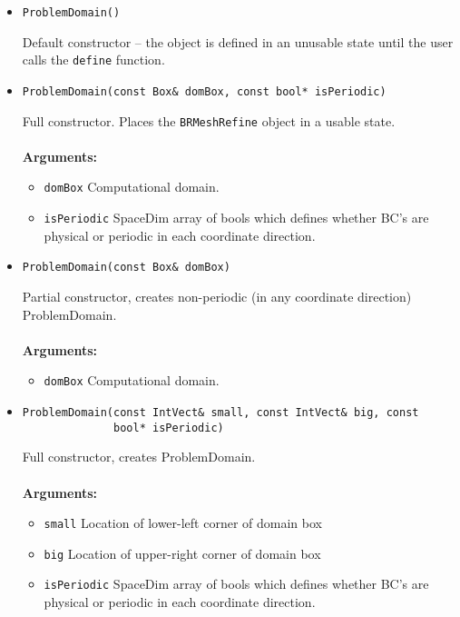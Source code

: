 \begin{itemize}
\item
\begin{verbatim}
ProblemDomain()
\end{verbatim}
Default constructor -- the object is defined in an unusable state
until the user calls the {\tt define} function.

\item
\begin{verbatim}
ProblemDomain(const Box& domBox, const bool* isPeriodic)
\end{verbatim}
Full constructor.  Places the {\tt BRMeshRefine} object in a usable
state. \\
\\
{\bf Arguments:} 
\begin{itemize} 
\item  \verb/domBox/ Computational domain.
\item  \verb/isPeriodic/ SpaceDim array of bools which defines
whether BC's are physical or periodic in each coordinate direction.   

\end{itemize}


\item
\begin{verbatim}
ProblemDomain(const Box& domBox)
\end{verbatim}
Partial constructor, creates non-periodic (in any coordinate
direction) ProblemDomain. \\
\\
{\bf Arguments:}
\begin{itemize}
\item \verb/domBox/ Computational domain.
\end{itemize}

\item
\begin{verbatim}
ProblemDomain(const IntVect& small, const IntVect& big, const
              bool* isPeriodic)
\end{verbatim}
Full constructor, creates ProblemDomain. \\
\\
{\bf Arguments:}
\begin{itemize}
\item \verb/small/ Location of lower-left corner of domain box
\item \verb/big/  Location of upper-right corner of domain box
\item  \verb/isPeriodic/ SpaceDim array of bools which defines
whether BC's are physical or periodic in each coordinate direction.   
\end{itemize}


\end{itemize}
